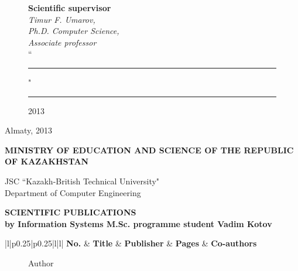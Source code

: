 \begin{titlepage}
	\begin{figure}[ht]
			\begin{minipage}[t]{0.6\linewidth}
				{\bf Scientific supervisor}\\

				{\em Timur F. Umarov,\\
				Ph.D. Computer Science,\\
				Associate professor}\\
				
				``\rule{2em}{0.4pt}" \rule{8em}{0.4pt} 2013\\
	     \end{minipage}
    \end{figure}
    
    \begin{center}
		\vfill
		Almaty, 2013
	\end{center}

	\pagebreak

	\begin{centering}
		{\bf{\MakeUppercase{Ministry of education and science of the republic of Kazakhstan}}

		\vspace{14pt}

		JSC ``Kazakh-British Technical University"\\
		Department of Computer Engineering}


		{\bf
		\MakeUppercase{Scientific publications}\\
		by Information Systems M.Sc. programme student Vadim Kotov
		}

		\vspace{14pt}
	\end{centering}

	\begin{centering}

		\begin{longtable}{|l|p{0.25\textwidth}|p{0.25\textwidth}|l|l|}
			\hline
			\textbf{No.} & \textbf{Title} & \textbf{Publisher} & \textbf{Pages} & \textbf{Co-authors}\\
			\endhead

			\hline

			\end{longtable}
		\end{centering}

		\begin{figure}[ht]
			\begin{minipage}[t]{0.5\linewidth}
				Author\\


\end{minipage}
\end{figure}
\end{titlepage}
